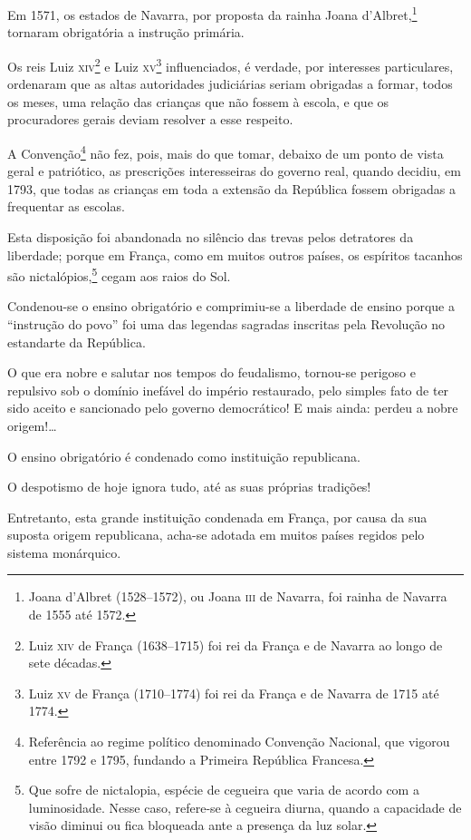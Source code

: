 Em 1571, os estados de Navarra, por proposta da rainha Joana
d'Albret,\footnote{Joana d'Albret (1528--1572), ou Joana \textsc{iii} de
  Navarra, foi rainha de Navarra de 1555 até 1572.} tornaram
obrigatória a instrução primária.

Os reis Luiz \textsc{xiv}\footnote{Luiz \textsc{xiv} de França (1638--1715) foi rei da
  França e de Navarra ao longo de sete décadas.} e Luiz \textsc{xv}\footnote{
  Luiz \textsc{xv} de França (1710--1774) foi rei da França e de Navarra de 1715
  até 1774.} influenciados, é verdade, por interesses particulares,
ordenaram que as altas autoridades judiciárias seriam obrigadas a
formar, todos os meses, uma relação das crianças que não fossem à
escola, e que os procuradores gerais deviam resolver a esse respeito.

A Convenção\footnote{Referência ao regime político denominado
  Convenção Nacional, que vigorou entre 1792 e 1795, fundando a Primeira
  República Francesa.} não fez, pois, mais do que tomar, debaixo de um
ponto de vista geral e patriótico, as prescrições interesseiras do
governo real, quando decidiu, em 1793, que todas as crianças em toda a
extensão da República fossem obrigadas a frequentar as escolas.

Esta disposição foi abandonada no silêncio das trevas pelos detratores
da liberdade; porque em França, como em muitos outros países, os
espíritos tacanhos são nictalópios,\footnote{Que sofre de nictalopia,
  espécie de cegueira que varia de acordo com a luminosidade. Nesse
  caso, refere-se à cegueira diurna, quando a capacidade de visão
  diminui ou fica bloqueada ante a presença da luz solar.} cegam aos
raios do Sol.

Condenou-se o ensino obrigatório e comprimiu-se a liberdade de ensino
porque a ``instrução do povo'' foi uma das legendas sagradas inscritas
pela Revolução no estandarte da República.

O que era nobre e salutar nos tempos do feudalismo, tornou-se perigoso e
repulsivo sob o domínio inefável do império restaurado, pelo simples
fato de ter sido aceito e sancionado pelo governo democrático! E mais
ainda: perdeu a nobre origem!\ldots{}

O ensino obrigatório é condenado como instituição republicana.

O despotismo de hoje ignora tudo, até as suas próprias tradições!

Entretanto, esta grande instituição condenada em França, por causa da
sua suposta origem republicana, acha-se adotada em muitos países regidos
pelo sistema monárquico.

